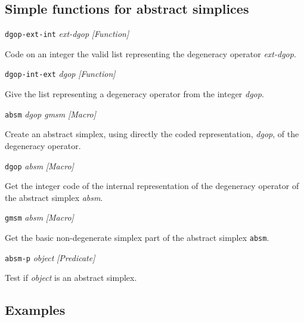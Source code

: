 \subsection {Simple functions for abstract simplices}

{\parindent=0mm
{\leftskip=5mm
{\tt dgop-ext-int} {\em ext-dgop} \hfill {\em [Function]}\par}
{\leftskip=15mm
Code on an integer the valid list representing the degeneracy o\-pe\-ra\-tor {\em ext-dgop}. \par}
{\leftskip=5mm
{\tt dgop-int-ext} {\em dgop} \hfill {\em [Function]}\par}
{\leftskip=15mm
Give the list representing a degeneracy operator from the integer {\em dgop}. \par}
{\leftskip=5mm
{\tt absm} {\em dgop gmsm} \hfill {\em [Macro]}\par}
{\leftskip=15mm
Create an abstract simplex, using directly the coded representation, {\em dgop}, of the degeneracy operator. \par}
{\leftskip=5mm
{\tt dgop} {\em absm} \hfill {\em [Macro]}\par}
{\leftskip=15mm
Get the integer code of the internal representation of the degeneracy operator of the
abstract simplex {\em absm}. \par}
{\leftskip=5mm
{\tt gmsm} {\em absm} \hfill {\em [Macro]}\par}
{\leftskip=15mm
Get the basic non-degenerate simplex part of the abstract simplex {\tt absm}. \par}
{\leftskip=5mm
{\tt absm-p} {\em object} \hfill {\em [Predicate]}\par}
{\leftskip=15mm
Test if {\em object} is an abstract simplex. \par}
}

\subsection* {Examples}

